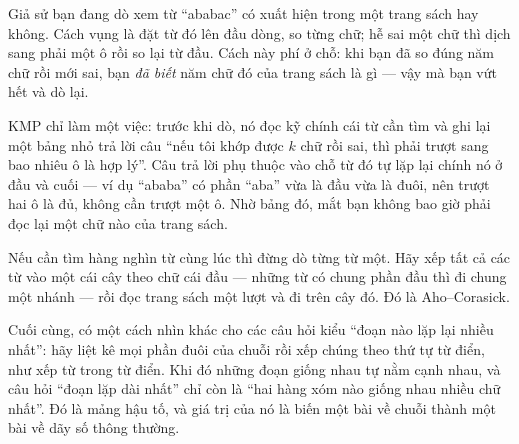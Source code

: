 \documentclass[../../algorithm.tex]{subfiles}
\begin{document}
\begin{dongian}
Giả sử bạn đang dò xem từ ``ababac'' có xuất hiện trong một trang sách hay không. Cách vụng là đặt từ đó lên đầu dòng, so từng chữ; hễ sai một chữ thì dịch sang phải một ô rồi so lại từ đầu. Cách này phí ở chỗ: khi bạn đã so đúng năm chữ rồi mới sai, bạn \emph{đã biết} năm chữ đó của trang sách là gì --- vậy mà bạn vứt hết và dò lại.

KMP chỉ làm một việc: trước khi dò, nó đọc kỹ chính cái từ cần tìm và ghi lại một bảng nhỏ trả lời câu ``nếu tôi khớp được \(k\) chữ rồi sai, thì phải trượt sang bao nhiêu ô là hợp lý''. Câu trả lời phụ thuộc vào chỗ từ đó tự lặp lại chính nó ở đầu và cuối --- ví dụ ``ababa'' có phần ``aba'' vừa là đầu vừa là đuôi, nên trượt hai ô là đủ, không cần trượt một ô. Nhờ bảng đó, mắt bạn không bao giờ phải đọc lại một chữ nào của trang sách.

Nếu cần tìm hàng nghìn từ cùng lúc thì đừng dò từng từ một. Hãy xếp tất cả các từ vào một cái cây theo chữ cái đầu --- những từ có chung phần đầu thì đi chung một nhánh --- rồi đọc trang sách một lượt và đi trên cây đó. Đó là Aho--Corasick.

Cuối cùng, có một cách nhìn khác cho các câu hỏi kiểu ``đoạn nào lặp lại nhiều nhất'': hãy liệt kê mọi phần đuôi của chuỗi rồi xếp chúng theo thứ tự từ điển, như xếp từ trong từ điển. Khi đó những đoạn giống nhau tự nằm cạnh nhau, và câu hỏi ``đoạn lặp dài nhất'' chỉ còn là ``hai hàng xóm nào giống nhau nhiều chữ nhất''. Đó là mảng hậu tố, và giá trị của nó là biến một bài về chuỗi thành một bài về dãy số thông thường.
\end{dongian}
\end{document}
